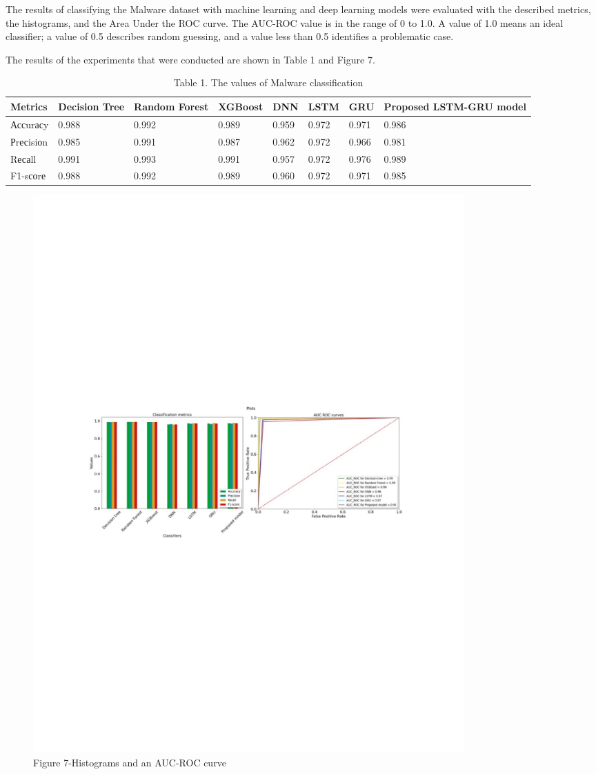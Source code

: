 The results of classifying the Malware dataset with machine learning and
deep learning models were evaluated with the described metrics, the
histograms, and the Area Under the ROC curve. The AUC-ROC value is in
the range of 0 to 1.0. A value of 1.0 means an ideal classifier; a value
of 0.5 describes random guessing, and a value less than 0.5 identifies a
problematic case.

The results of the experiments that were conducted are shown in Table 1
and Figure 7.

\begin{table}[H]
\caption*{Table 1. The values of Malware classification}
\centering
\begin{tabular}{|l|l|l|l|l|l|l|l|}
\hline
Metrics   & Decision Tree & Random Forest & XGBoost & DNN   & LSTM  & GRU   & \multirow{1}{2cm}{Proposed LSTM-GRU model} \\ \hline
Ассurасy  & 0.988         & 0.992         & 0.989   & 0.959 & 0.972 & 0.971 & 0.986                   \\ \hline
Рrесisiоn & 0.985         & 0.991         & 0.987   & 0.962 & 0.972 & 0.966 & 0.981                   \\ \hline
Rесаll    & 0.991         & 0.993         & 0.991   & 0.957 & 0.972 & 0.976 & 0.989                   \\ \hline
F1-sсоrе  & 0.988         & 0.992         & 0.989   & 0.960 & 0.972 & 0.971 & 0.985                   \\ \hline
\end{tabular}
\end{table}

\begin{figure}[H]
	\centering
	\includegraphics[width=0.8\textwidth]{media/ict/image85}
	\caption*{Figure 7-Histograms and an AUC-ROC curve}
\end{figure}

